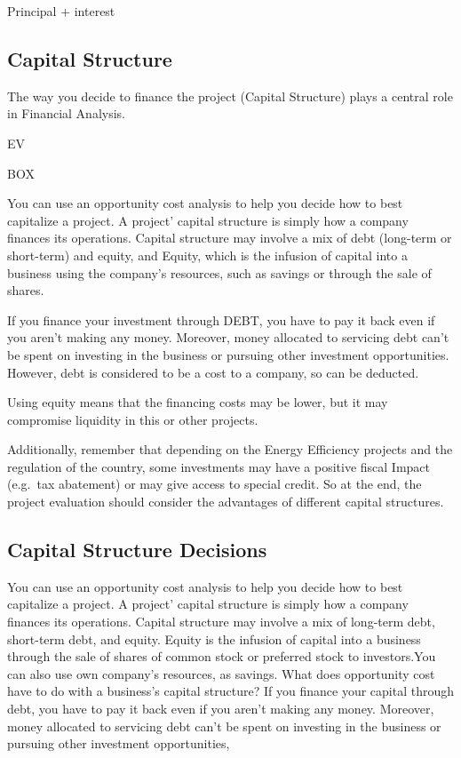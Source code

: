 \documentclass[]{book}
\theoremstyle{definition}
\theoremstyle{definition}
\theoremstyle{definition}
\theoremstyle{remark}
\begin{document}
Principal + interest

\subsection{Capital Structure}\label{capital-structure}

The way you decide to finance the project (Capital Structure) plays a
central role in Financial Analysis.

EV

BOX

You can use an opportunity cost analysis to help you decide how to best
capitalize a project. A project' capital structure is simply how a
company finances its operations. Capital structure may involve a mix of
debt (long-term or short-term) and equity, and Equity, which is the
infusion of capital into a business using the company's resources, such
as savings or through the sale of shares.

If you finance your investment through DEBT, you have to pay it back
even if you aren't making any money. Moreover, money allocated to
servicing debt can't be spent on investing in the business or pursuing
other investment opportunities. However, debt is considered to be a cost
to a company, so can be deducted.

Using equity means that the financing costs may be lower, but it may
compromise liquidity in this or other projects.

Additionally, remember that depending on the Energy Efficiency projects
and the regulation of the country, some investments may have a positive
fiscal Impact (e.g.~tax abatement) or may give access to special credit.
So at the end, the project evaluation should consider the advantages of
different capital structures.

\subsection{Capital Structure
Decisions}\label{capital-structure-decisions}

You can use an opportunity cost analysis to help you decide how to best
capitalize a project. A project' capital structure is simply how a
company finances its operations. Capital structure may involve a mix of
long-term debt, short-term debt, and equity. Equity is the infusion of
capital into a business through the sale of shares of common stock or
preferred stock to investors.You can also use own company's resources,
as savings. What does opportunity cost have to do with a business's
capital structure? If you finance your capital through debt, you have to
pay it back even if you aren't making any money. Moreover, money
allocated to servicing debt can't be spent on investing in the business
or pursuing other investment opportunities,
\end{document}

